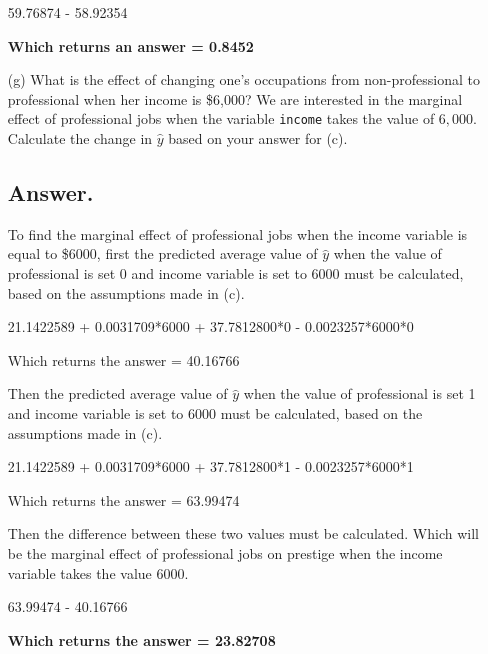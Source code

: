 \documentclass[12pt,letterpaper]{article}
\begin{document}
\begin{enumerate}
	\vspace{0.1cm}
	
	59.76874 - 58.92354 
	
	\vspace{0.1cm}
	
	\textbf{Which returns an answer = 0.8452}
	
	\vspace{10cm}
	
	
	\item [(g)]
	What is the effect of changing one's occupations from non-professional to professional when her income is \$6,000? We are interested in the marginal effect of professional jobs when the variable \texttt{income} takes the value of $6,000$. Calculate the change in $\hat{y}$ based on your answer for (c).
	
	\subsection*{Answer.}
	
	To find the marginal effect of professional jobs when the income variable is equal to \$6000, first the predicted average value of $\hat{y}$ when the value of professional is set 0 and income variable is set to 6000 must be calculated, based on the assumptions made in (c).
	
	\vspace{0.1cm}
	
	21.1422589 + 0.0031709*6000 + 37.7812800*0 - 0.0023257*6000*0
	
	\vspace{0.1cm}
	
	Which returns the answer = 40.16766
	
	\vspace{0.1cm}
	
	Then the predicted average value of $\hat{y}$ when the value of professional is set 1 and income variable is set to 6000 must be calculated, based on the assumptions made in (c).
	
	\vspace{0.1cm}
	
	21.1422589 + 0.0031709*6000 + 37.7812800*1 - 0.0023257*6000*1
	
	\vspace{0.1cm}
	
	Which returns the answer = 63.99474
	
	Then the difference between these two values must be calculated. Which will be the marginal effect of professional jobs on prestige when the income variable takes the value 6000.
	
	\vspace{0.1cm}
	
	63.99474 - 40.16766
	
	\vspace{0.1cm}
	
	\textbf{Which returns the answer = 23.82708}
	
	
\end{enumerate}
\end{document}
